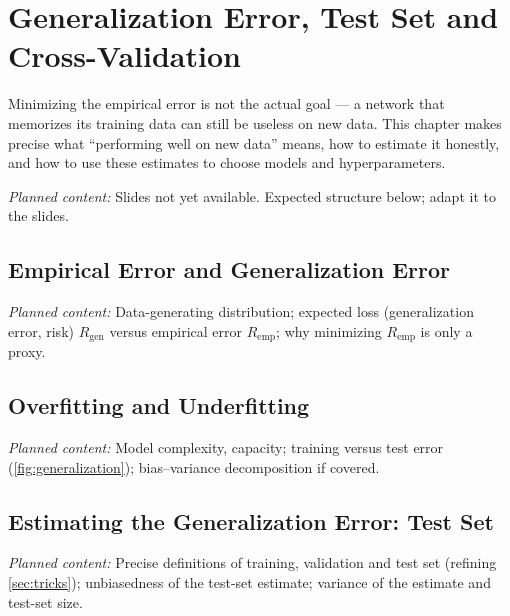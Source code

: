 \documentclass[11pt, oneside]{book}
\newcommand{\Remp}{R_{\mathrm{emp}}}     %
\newcommand{\Rgen}{R_{\mathrm{gen}}}     %
\newcommand{\planned}[1]{%
  \par{\small\color{gray!70!black}\textit{Planned content:} #1}\par}
\let\originalsection\section
\renewcommand{\section}{\Needspace{7\baselineskip}\originalsection}
\begin{document}

\chapter{Generalization Error, Test Set and Cross-Validation}
\label{ch:generalization}

Minimizing the empirical error is not the actual goal --- a network that
memorizes its training data can still be useless on new data. This chapter
makes precise what ``performing well on new data'' means, how to estimate it
honestly, and how to use these estimates to choose models and
hyperparameters.

\planned{Slides not yet available. Expected structure below; adapt it to the
slides.}

\section{Empirical Error and Generalization Error}
\planned{Data-generating distribution; expected loss (generalization error,
risk) $\Rgen$ versus empirical error $\Remp$; why minimizing $\Remp$ is only
a proxy.}

\section{Overfitting and Underfitting}
\planned{Model complexity, capacity; training versus test error
(\cref{fig:generalization}); bias--variance decomposition if covered.}

\section{Estimating the Generalization Error: Test Set}
\planned{Precise definitions of training, validation and test set
(refining \cref{sec:tricks}); unbiasedness of the test-set estimate;
variance of the estimate and test-set size.}
\end{document}

